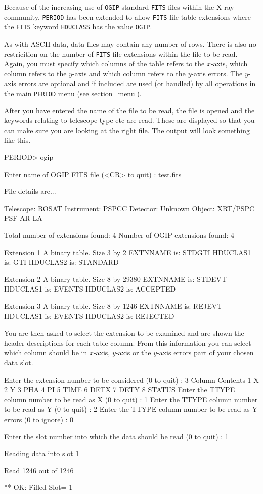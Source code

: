 \documentclass[twoside,11pt,noabs,nolof]{starlink}
\begin{document}
Because of the increasing use of \texttt{OGIP} standard \texttt{FITS} files
within the X-ray community, \texttt{PERIOD} has been extended to allow
\texttt{FITS} file table extensions where the \texttt{FITS} keyword \texttt{HDUCLASS} has the value \texttt{OGIP}.

As with ASCII data, data files may contain any number of rows. There is
also no restricition on the number of \texttt{FITS} file extensions within
the file to be read.  Again, you must specify which columns of
the table refers to the $x$-axis, which column refers to the $y$-axis
and which column refers to the $y$-axis errors. The $y$-axis errors are
optional and if included are used (or handled) by all operations in the
main \texttt{PERIOD} menu (see section~\ref{menu}).

After you have entered the name of the file to be read, the file is
opened and the keywords relating to telescope type etc are
read. These are displayed so that you can make sure you are looking at
the right file. The output will look something like this.

\begin{terminalv}
 PERIOD> ogip

 Enter name of OGIP FITS file (<CR> to quit) : test.fits

 File details are...

 Telescope:   ROSAT
 Instrument:  PSPCC
 Detector:    Unknown
 Object:      XRT/PSPC PSF AR LA

 Total number of extensions found:   4
 Number of OGIP extensions found:    4

 Extension   1
 A binary table.
 Size   3 by   2
 EXTNNAME is:  STDGTI
 HDUCLAS1 is:  GTI
 HDUCLAS2 is:  STANDARD

 Extension   2
 A binary table.
 Size   8 by   29380
 EXTNNAME is:  STDEVT
 HDUCLAS1 is:  EVENTS
 HDUCLAS2 is:  ACCEPTED

 Extension   3
 A binary table.
 Size   8 by   1246
 EXTNNAME is:  REJEVT
 HDUCLAS1 is:  EVENTS
 HDUCLAS2 is:  REJECTED
\end{terminalv}

You are then asked to select the extension to be examined and are shown
the header descriptions for each table column. From this information
you can select which column should be in $x$-axis, $y$-axis or the
$y$-axis errors part of your chosen data slot.

\begin{terminalv}
 Enter the extension number to be considered (0 to quit) : 3
 Column        Contents
   1             X
   2             Y
   3             PHA
   4             PI
   5             TIME
   6             DETX
   7             DETY
   8             STATUS
 Enter the TTYPE column number to be read as X (0 to quit) : 1
 Enter the TTYPE column number to be read as Y (0 to quit) : 2
 Enter the TTYPE column number to be read as Y errors (0 to ignore) : 0

 Enter the slot number into which the data should be read (0 to quit) : 1

 Reading data into slot   1

 Read   1246 out of   1246

 ** OK: Filled Slot=  1
\end{terminalv}
\end{document}

